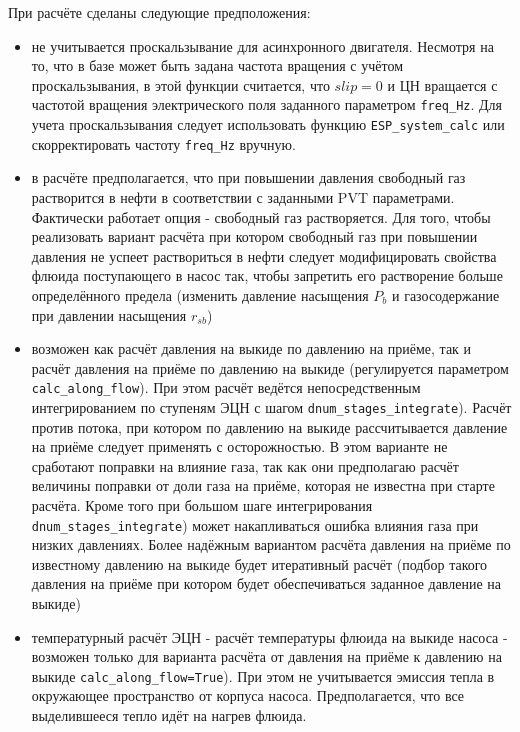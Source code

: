 При расчёте сделаны следующие предположения:
\begin{itemize}
	\item не учитывается проскальзывание для асинхронного двигателя. Несмотря на то, что в базе может быть задана частота вращения с учётом проскальзывания, в этой функции считается, что \(slip = 0\) и ЦН вращается с частотой вращения электрического поля заданного параметром \texttt{freq_Hz}. Для учета проскальзывания следует использовать функцию \texttt{ESP_system_calc} или скорректировать частоту \texttt{freq_Hz} вручную.
	\item в расчёте предполагается, что при повышении давления свободный газ растворится в нефти в соответствии с заданными PVT параметрами. Фактически работает опция - свободный газ растворяется. Для того, чтобы реализовать вариант расчёта при котором свободный газ при повышении давления не успеет раствориться в нефти следует модифицировать свойства флюида поступающего в насос так, чтобы запретить его растворение больше определённого предела (изменить давление насыщения $P_b$ и газосодержание при давлении насыщения $r_{sb}$)
	\item возможен как расчёт давления на выкиде по давлению на приёме, так и расчёт давления на приёме по давлению на выкиде (регулируется параметром \texttt{calc_along_flow}). При этом расчёт ведётся непосредственным интегрированием по ступеням ЭЦН с шагом \texttt{dnum_stages_integrate}). Расчёт против потока, при котором по давлению на выкиде рассчитывается давление на приёме следует применять с осторожностью. В этом варианте не сработают поправки на влияние газа, так как они предполагаю расчёт величины поправки от доли газа на приёме, которая не известна при старте расчёта. Кроме того при большом шаге интегрирования \texttt{dnum_stages_integrate}) может накапливаться ошибка влияния газа при низких давлениях. Более надёжным вариантом расчёта давления на приёме по известному давлению на выкиде будет итеративный расчёт (подбор такого давления на приёме при котором будет обеспечиваться заданное давление на выкиде)
	\item температурный расчёт ЭЦН - расчёт температуры флюида на выкиде насоса - возможен только для варианта расчёта от давления на приёме к давлению на выкиде  \texttt{calc_along_flow=True}). При этом не учитывается эмиссия тепла в окружающее пространство от корпуса насоса. Предполагается, что все выделившееся тепло идёт на нагрев флюида.
	
\end{itemize}

